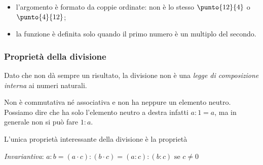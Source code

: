 \vspace{1em}
\begin{minipage}[t]{.48\textwidth}
\begin{center}
\begin{inaccessibleblock}
\end{inaccessibleblock}
\end{center}
\end{minipage}
\hfill
\begin{minipage}[t]{.48\textwidth}
\begin{center}
\begin{inaccessibleblock}
\end{inaccessibleblock}
\end{center}
\end{minipage}

\vspace{-1em}
\begin{osservazione}
\begin{itemize} [nosep]
\item l'argomento è formato da coppie ordinate: non è lo stesso 
\(\punto{12}{4}\) o \(\punto{4}{12}\);
\item la funzione è definita solo quando il primo numero è un multiplo
del secondo.
\end{itemize}

\end{osservazione}

\subsubsection{Proprietà della divisione}

Dato che non dà sempre un risultato, la divisione non è una 
\emph{legge di composizione interna} ai numeri naturali. 

Non è commutativa né associativa e non ha neppure un elemento neutro.
Possiamo dire che ha solo l'elemento neutro a destra infatti \(a : 1 = a\), 
ma in generale non si può fare \(1 : a\).

L'unica proprietà interessante della divisione è la proprietà
\begin{itemize*}
 \item \emph{Invariantiva}: 
  \(a : b = (a \cdot c) : (b \cdot c) = (a : c) : (b : c) \text{ se } c \neq 
0\)
\end{itemize*}

